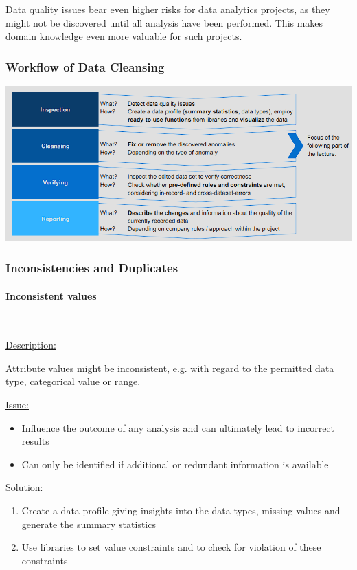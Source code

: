 \documentclass[12pt, a4paper, oneside, justified]{article}
\begin{document}
Data quality issues bear even higher risks for data analytics projects, as they might not be discovered until all analysis have been performed. This makes domain knowledge even more valuable for such projects.

\subsubsection{Workflow of Data Cleansing}

\begin{center}
\includegraphics[width=1\textwidth]{../img/3-14.png}
\end{center}

\subsubsection{Inconsistencies and Duplicates}

\paragraph*{Inconsistent values}~{}

\underline{Description:}

Attribute values might be inconsistent, e.g. with regard to the permitted data type, categorical value or range.

\underline{Issue:}
\begin{itemize}
    \item Influence the outcome of any analysis and can ultimately lead to incorrect results
    \item Can only be identified if additional or redundant information is available
\end{itemize}

\underline{Solution:} 

\begin{enumerate}
    \item Create a data profile giving insights into the data types, missing values and generate the summary statistics
    \item Use libraries to set value constraints and to check for violation of these constraints
\end{enumerate}
\end{document}
